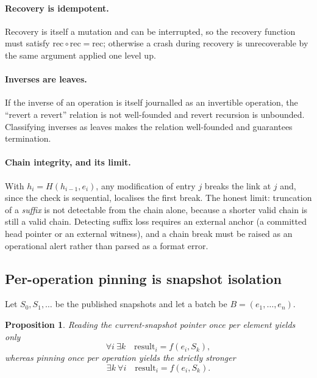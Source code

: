 \documentclass[11pt]{article}
\newtheorem{prop}{Proposition}[section]
\begin{document}
\paragraph{Recovery is idempotent.} Recovery is itself a mutation and can be
interrupted, so the recovery function must satisfy $\mathrm{rec} \circ
\mathrm{rec} = \mathrm{rec}$; otherwise a crash during recovery is
unrecoverable by the same argument applied one level up.

\paragraph{Inverses are leaves.} If the inverse of an operation is itself
journalled as an invertible operation, the ``revert a revert'' relation is not
well-founded and revert recursion is unbounded. Classifying inverses as leaves
makes the relation well-founded and guarantees termination.

\paragraph{Chain integrity, and its limit.} With $h_i = H(h_{i-1}, e_i)$, any
modification of entry $j$ breaks the link at $j$ and, since the check is
sequential, localises the first break. The honest limit: truncation of a
\emph{suffix} is not detectable from the chain alone, because a shorter valid
chain is still a valid chain. Detecting suffix loss requires an external anchor
(a committed head pointer or an external witness), and a chain break must be
raised as an operational alert rather than parsed as a format error.

\subsection{Per-operation pinning is snapshot isolation}
\label{lbl:HS-MUT-03}

Let $S_0, S_1, \dots$ be the published snapshots and let a batch be $B = (e_1,
\dots, e_n)$.

\begin{prop}
Reading the current-snapshot pointer once per element yields only
\begin{equation}
\forall i\ \exists k \quad \mathrm{result}_i = f(e_i, S_k),
\end{equation}
whereas pinning once per operation yields the strictly stronger
\begin{equation}
\exists k\ \forall i \quad \mathrm{result}_i = f(e_i, S_k).
\end{equation}
\end{prop}
\end{document}
